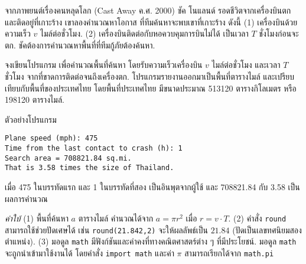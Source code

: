 \begin{Exercise}
\label{prog: assignment cast away}
จากภาพยนต์เรื่องคนหลุดโลก (Cast Away ค.ศ. 2000)
ชัค โนแลนด์ รอดชีวิตจากเครื่องบินตก และติดอยู่ที่เกาะร้าง
เขาลองคำนวณหาโอกาส
ที่ทีมค้นหาจะพบเขาที่เกาะร้าง
ดังนี้
(1) เครื่องบินด้วยความเร็ว $v$ ไมล์ต่อชั่วโมง.
(2) เครื่องบินติดต่อกับหอควบคุมการบินไม่ได้ เป็นเวลา $T$ ชั่งโมงก่อนจะตก.
ชัคต้องการคำนวณหาพื้นที่ที่ทีมกู้ภัยต้องค้นหา.

จงเขียนโปรแกรม เพื่อคำนวณพื้นที่ค้นหา โดยรับความเร็วเครื่องบิน $v$ ไมล์ต่อชั่วโมง
และเวลา $T$ ชั่วโมง จากที่ขาดการติดต่อจนถึงเครื่องตก.
โปรแกรมรายงานออกมาเป็นพื้นที่ตารางไมล์  และเปรียบเทียบกับพื้นที่ของประเทศไทย โดยพื้นที่ประเทศไทย มีขนาดประมาณ 513120 ตารางกิโลเมตร หรือ 198120 ตารางไมล์.

ตัวอย่างโปรแกรม
\begin{verbatim}
Plane speed (mph): 475
Time from the last contact to crash (h): 1
Search area = 708821.84 sq.mi.
That is 3.58 times the size of Thailand.
\end{verbatim}
เมื่อ 475 ในบรรทัดแรก และ 1 ในบรรทัดที่สอง เป็นอินพุตจากผู้ใช้
และ 708821.84 กับ 3.58 เป็นผลการคำนวณ

\textit{คำใบ้} 
(1) พื้นที่ค้นหา $a$ ตารางไมล์ คำนวณได้จาก $a = \pi r^2$ เมื่อ $r = v \cdot T$.
(2) คำสั่ง \texttt{round} สามารถใช้ช่วยปัดเศษได้
เช่น \verb|round(21.842,2)| จะให้ผลลัพธ์เป็น $21.84$ (ปัดเป็นเลขทศนิยมสองตำแหน่ง).
(3) มอดูล \texttt{math} มีฟังก์ชันและค่าคงที่ทางคณิตศาสตร์ต่าง ๆ ที่มีประโยชน์.
มอดูล \texttt{math} จะถูกนำเข้ามาใช้งานได้ โดยคำสั่ง \verb|import math|
และค่า $\pi$ สามารถเรียกได้จาก \verb|math.pi|

\end{Exercise}

